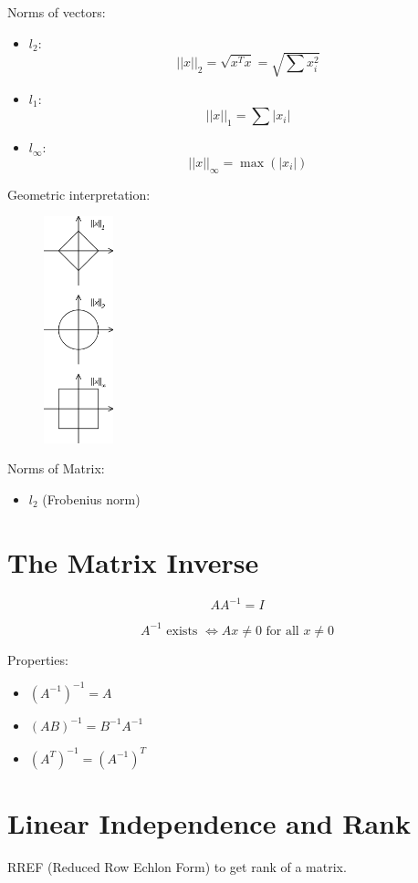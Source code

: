 \documentclass[letterpaper,10pt]{article}
\begin{document}
Norms of vectors:
\begin{itemize}
	\item $l_2$: $$||x||_2=\sqrt{x^Tx}=\sqrt{\sum{x_i^2}}$$
	\item $l_1$: $$||x||_1=\sum|x_i|$$
	\item $l_\infty$: $$||x||_\infty=\max(|x_i|)$$
\end{itemize}

Geometric interpretation:
\begin{figure}[!h]
	\centering
	\includegraphics[width=2cm]{./img/norms.png}
\end{figure}

Norms of Matrix:
\begin{itemize}
	\item $l_2$ (Frobenius norm)
\end{itemize}

\section{The Matrix Inverse}

$$AA^{-1}=I$$

$$A^{-1} \text{ exists } \Leftrightarrow Ax\neq 0 \text{ for all } x\neq 0$$

Properties:
\begin{itemize}
	\item $(A^{-1})^{-1}=A$
	\item $(AB)^{-1}=B^{-1}A^{-1}$
	\item $(A^T)^{-1}=(A^{-1})^T$
\end{itemize}

\section{Linear Independence and Rank}

RREF (Reduced Row Echlon Form) to get rank of a matrix.
\end{document}

